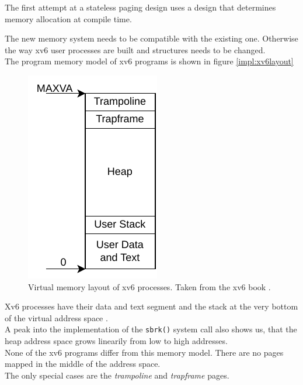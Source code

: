 \cite{tanenbaumOS}
The first attempt at a stateless  paging design
uses a design that determines memory allocation at compile time.





The new memory system needs to be compatible with the existing one. Otherwise the way xv6
user processes are built and structures needs to be changed.\\
The program memory model of xv6 programs is shown in figure \ref{impl:xv6layout}

\begin{figure}[t!]
    \centering
    \includegraphics[scale=.5]{figures/prog_vm.pdf}
    \caption[xv6 memory layout]{Virtual memory layout of xv6 processes. Taken from the xv6 book \cite{cox2011xv6}.}
    \label{impl:proclayout}
\end{figure}

Xv6 processes have their data and text segment and the stack at the very bottom of the virtual
address space \cite{cox2011xv6}.\\
A peak into the implementation of the \texttt{sbrk()} system call also shows us, that the heap
address space grows linearily from low to high addresses.\\
None of the xv6 programs differ from this memory model. There are no pages mapped in the
middle of the address space.\\
The only special cases are the \textit{trampoline} and \textit{trapframe} pages.

